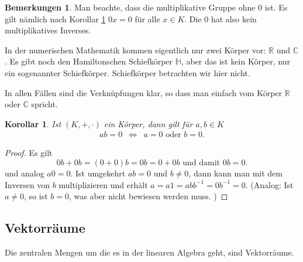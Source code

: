 \documentclass[index=totoc]{scrartcl}%
\newtheorem{cor}[thm]{Korollar}
\theoremstyle{definition}
\newtheorem{bemn}[defi]{Bemerkungen}
\newcommand{\R}{\mathbb R}
\newcommand{\C}{\mathbb C}
\newcommand{\Hd}{\mathbb H}
\begin{document}
\begin{bemn}
  Man beachte, dass die multiplikative Gruppe ohne $0$ ist.
  Es gilt nämlich nach Korollar \ref{cor:factor0K} $0x=0$ für alle $x\in K$. 
  Die $0$ hat also kein multiplikatives Inverses.
  
  In der numerischen Mathematik kommen eigentlich nur zwei Körper vor:
  $\R$ und $\C$.
  Es gibt noch den Hamiltonschen Schiefkörper $\Hd$,
  aber das ist kein Körper, nur ein sogenannter Schiefkörper.
  Schiefkörper betrachten wir hier nicht.

  In allen Fällen sind die Verknüpfungen klar,
  so dass man einfach vom Körper $\R$ oder $\C$ spricht.
\end{bemn}

\begin{cor}\label{cor:factor0K}
  Ist $(K, +, \cdot)$ ein Körper, dann gilt für $a,b\in K$
  \begin{eqnarray*}
    ab=0 & \iff & a=0\text{ oder }b=0. 
  \end{eqnarray*}
\end{cor}

\begin{proof}
  Es gilt
  \begin{equation*}
    0b+0b=(0+0)b=0b=0+0b\text{ und damit }0b=0.
  \end{equation*}
  und analog $a0=0$.
  Ist umgekehrt $ab=0$ und $b\not=0$,
  dann kann man mit dem Inversen von $b$ multiplizieren
  und erhält $a=a1=abb^{-1}=0b^{-1}=0$.
  (Analog: Ist $a\not=0$, so ist $b=0$, was aber nicht bewiesen werden muss. )
\end{proof}



\subsection{Vektorräume}
\label{subsec:vectorspace}

Die zentralen Mengen um die es in der linearen Algebra geht,
sind Vektorräume.
\end{document}
